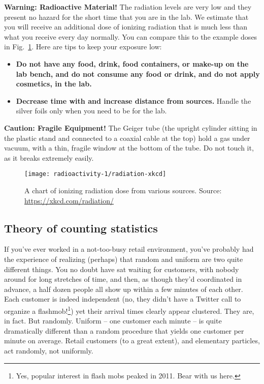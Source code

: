 \begin{framed}
	\textbf{Warning: Radioactive Material!} The radiation levels are very low and they present no hazard for the short time that you are in the lab. We estimate that you will receive an additional dose of ionizing radiation that is much less than what you receive every day normally. You can compare this to the example doses in Fig.~\ref{rad1:doses}. Here are tips to keep your exposure low:
	\begin{itemize}
		\item \textbf{Do not have any food, drink, food containers, or make-up on the lab bench, and do not consume any food or drink, and do not apply cosmetics, in the lab.}
		
		\item \textbf{Decrease time with and increase distance from sources.} Handle the silver foils only when you need to be for the lab.
	\end{itemize}
\end{framed}

\begin{framed}
	\textbf{Caution: Fragile Equipment!} The Geiger tube (the upright cylinder sitting in the plastic stand and connected to a coaxial cable at the top) hold a gas under vacuum, with a thin, fragile window at the bottom of the tube. Do not touch it, as it breaks extremely easily.
\end{framed}

\begin{figure}
	\centering
	\texttt{[image: radioactivity-1/radiation-xkcd]}
	\caption{A chart of ionizing radiation dose from various sources. Source: \url{https://xkcd.com/radiation/}}\label{rad1:doses}
\end{figure}

\subsection{Theory of counting statistics}

If you've ever worked in a not-too-busy retail environment, you’ve probably had the
experience of realizing (perhaps) that random and uniform are two quite different things.
You no doubt have sat waiting for customers, with nobody around for long stretches of
time, and then, as though they'd coordinated in advance, a half dozen people all show up
within a few minutes of each other. Each customer is indeed independent (no, they didn't
have a Twitter call to organize a flashmob!\footnote{Yes, popular interest in flash mobs peaked in 2011. Bear with us here.}) yet their arrival times clearly appear clustered. They are, in fact. But randomly. Uniform – one customer each minute – is quite dramatically different than a random procedure that yields one customer per minute on average. Retail customers (to a great extent), and elementary particles, act randomly, not uniformly.

